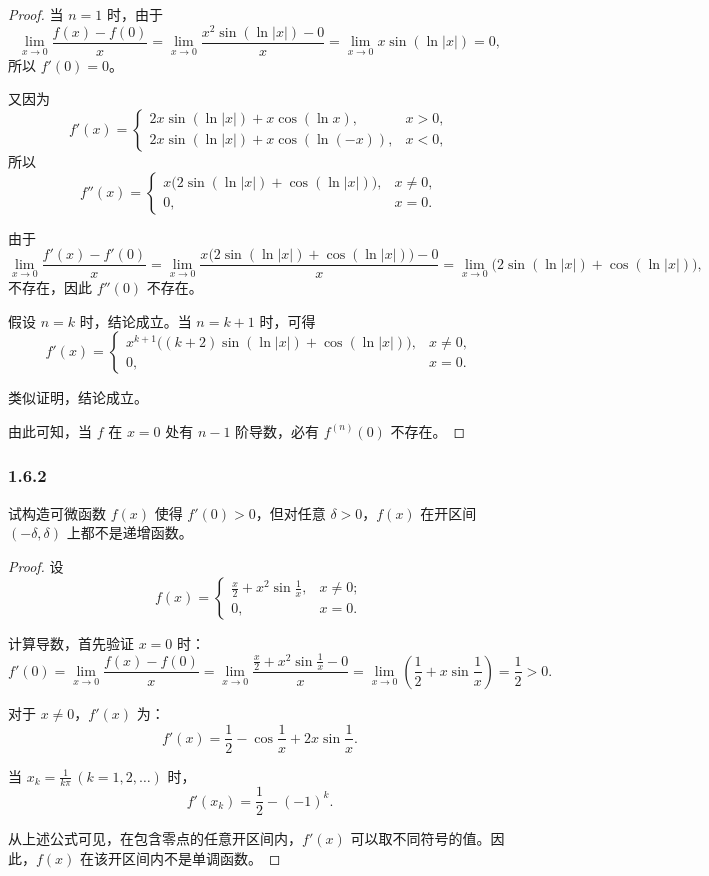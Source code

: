 \documentclass[12pt]{ctexart}
\begin{document}
\begin{proof}
当 $n = 1$ 时，由于
\[
\lim_{x \to 0} \frac{f(x) - f(0)}{x} = \lim_{x \to 0} \frac{x^2 \sin (\ln |x|) - 0}{x} = \lim_{x \to 0} x \sin (\ln |x|) = 0,
\]
所以 $f'(0) = 0$。

又因为
\[
f'(x) =
\begin{cases}
2x \sin (\ln |x|) + x \cos (\ln x), & x > 0, \\
2x \sin (\ln |x|) + x \cos (\ln (-x)), & x < 0,
\end{cases}
\]
所以
\[
f''(x) =
\begin{cases}
x \big( 2 \sin (\ln |x|) + \cos (\ln |x|) \big), & x \neq 0, \\
0, & x = 0.
\end{cases}
\]

由于
\[
\lim_{x \to 0} \frac{f'(x) - f'(0)}{x} = \lim_{x \to 0} \frac{x \big( 2 \sin (\ln |x|) + \cos (\ln |x|) \big) - 0}{x} 
= \lim_{x \to 0} \big( 2 \sin (\ln |x|) + \cos (\ln |x|) \big),
\]
不存在，因此 $f''(0)$ 不存在。

假设 $n = k$ 时，结论成立。当 $n = k + 1$ 时，可得
\[
f'(x) =
\begin{cases}
x^{k+1} \big( (k + 2) \sin (\ln |x|) + \cos (\ln |x|) \big), & x \neq 0, \\
0, & x = 0.
\end{cases}
\]

类似证明，结论成立。

由此可知，当 $f$ 在 $x = 0$ 处有 $n - 1$ 阶导数，必有 $f^{(n)}(0)$ 不存在。
\end{proof}

\subsubsection*{1.6.2}

试构造可微函数 $f(x)$ 使得 $f'(0) > 0$，但对任意 $\delta > 0$，$f(x)$ 在开区间 $(-\delta, \delta)$ 上都不是递增函数。

\begin{proof}
设
\[
f(x) =
\begin{cases}
\frac{x}{2} + x^2 \sin \frac{1}{x}, & x \neq 0; \\
0, & x = 0.
\end{cases}
\]

计算导数，首先验证 $x = 0$ 时：
\[
f'(0) = \lim_{x \to 0} \frac{f(x) - f(0)}{x} = \lim_{x \to 0} \frac{\frac{x}{2} + x^2 \sin \frac{1}{x} - 0}{x}
= \lim_{x \to 0} \left( \frac{1}{2} + x \sin \frac{1}{x} \right) = \frac{1}{2} > 0.
\]

对于 $x \neq 0$，$f'(x)$ 为：
\[
f'(x) = \frac{1}{2} - \cos \frac{1}{x} + 2x \sin \frac{1}{x}.
\]

当 $x_k = \frac{1}{k\pi} \, (k = 1, 2, \dots)$ 时，
\[
f'(x_k) = \frac{1}{2} - (-1)^k.
\]

从上述公式可见，在包含零点的任意开区间内，$f'(x)$ 可以取不同符号的值。因此，$f(x)$ 在该开区间内不是单调函数。
\end{proof}
\end{document}
